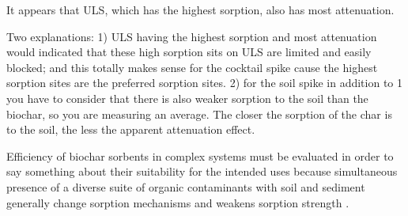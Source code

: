 It appears that ULS, which has the highest sorption, also has most attenuation. 

Two explanations: 1) ULS having the highest sorption and most attenuation would indicated that these high sorption sits on ULS are limited and easily blocked; and this totally makes sense for the cocktail spike cause the highest sorption sites are the preferred sorption sites. 2) for the soil spike in addition to 1 you have to consider that there is also weaker sorption to the soil than the biochar, so you are measuring an average. The closer the sorption of the char is to the soil, the less the apparent attenuation effect.

Efficiency of biochar sorbents in complex systems must be evaluated in order to say something about their suitability for the intended uses because simultaneous presence of a diverse suite of organic contaminants with soil and sediment generally change sorption mechanisms and weakens sorption strength \citep{zhou2010sorption}.

